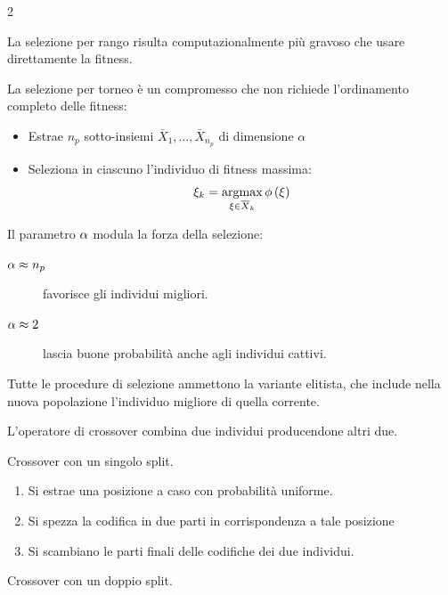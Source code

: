 \documentclass[\main/main.tex]{subfiles}
\begin{document}
\begin{multicols}{2}
\begin{observation}
    La selezione per rango risulta computazionalmente più gravoso che usare direttamente la fitness.
\end{observation}
\begin{definition}
    La selezione per torneo è un compromesso che non richiede l'ordinamento completo delle fitness:
    \begin{itemize}
        \item Estrae \(n_p\) sotto-insiemi \(\bar{X}_1, \ldots, \bar{X}_{n_p}\) di dimensione \(\alpha\)
        \item Seleziona in ciascuno l'individuo di fitness massima:
        \[
            \xi_k = \operatorname*{argmax}_{\xi \in \overline{X}_k} \phi\left(\xi\right)
        \]
    \end{itemize}
    
    Il parametro \(\alpha\) modula la forza della selezione:
    \begin{description}
        \item[\(\alpha\approx n_p\)] favorisce gli individui migliori.
        \item[\(\alpha\approx 2\)] lascia buone probabilità anche agli individui cattivi.
    \end{description}
\end{definition}
\begin{observation}
    Tutte le procedure di selezione ammettono la variante elitista, che include nella nuova popolazione l'individuo migliore di quella corrente.
\end{observation}
\begin{definition}[Crossover]
L'operatore di crossover combina due individui producendone altri due.
\end{definition}
    \begin{definition}
        Crossover con un singolo split.
        \begin{enumerate}
            \item Si estrae una posizione a caso con probabilità uniforme.
            \item Si spezza la codifica in due parti in corrispondenza a tale posizione
            \item Si scambiano le parti finali delle codifiche dei due individui.
        \end{enumerate}
    \end{definition}
    \begin{definition}
        Crossover con un doppio split.
        \begin{enumerate}

\end{enumerate}
\end{definition}
\end{multicols}
\end{document}
